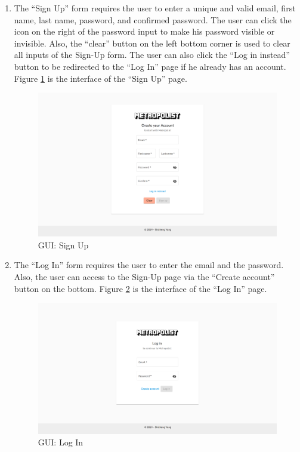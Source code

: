 \begin{enumerate}
  \item The ``Sign Up'' form requires the user to enter a unique and valid email, first name, last name, password, and confirmed password. The user can click the icon on the right of the password input to make his password visible or invisible. Also, the ``clear'' button on the left bottom corner is used to clear all inputs of the Sign-Up form. The user can also click the ``Log in instead'' button to be redirected to the ``Log In'' page if he already has an account. Figure \ref{fig:GUI signup} is the interface of the ``Sign Up'' page.

  \begin{figure}[htbp]
  \centering
  \includegraphics[width=\textwidth]{section04/assets/GUI-signup.png}
  \caption[GUI: Sign Up]{\label{fig:GUI signup}GUI: Sign Up}
  \end{figure}

  \item The ``Log In'' form requires the user to enter the email and the password. Also, the user can access to the Sign-Up page via the ``Create account'' button on the bottom. Figure \ref{fig:GUI login} is the interface of the ``Log In'' page.

  \begin{figure}[htbp]
  \centering
  \includegraphics[width=\textwidth]{section04/assets/GUI-login.png}
  \caption[GUI: Log In]{\label{fig:GUI login}GUI: Log In}
  \end{figure}


\end{enumerate}

